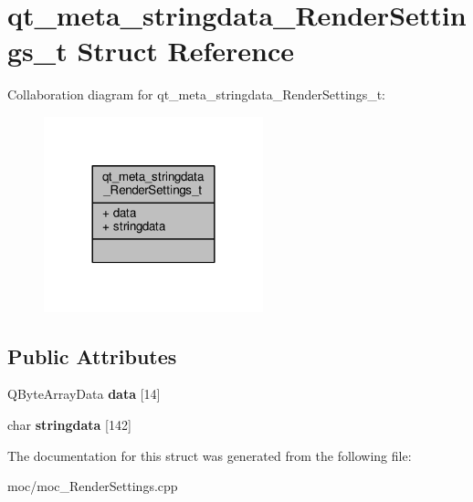 \hypertarget{structqt__meta__stringdata___render_settings__t}{\section{qt\-\_\-meta\-\_\-stringdata\-\_\-\-Render\-Settings\-\_\-t Struct Reference}
\label{structqt__meta__stringdata___render_settings__t}
}


Collaboration diagram for qt\-\_\-meta\-\_\-stringdata\-\_\-\-Render\-Settings\-\_\-t\-:
\nopagebreak
\begin{figure}[H]
\begin{center}
\leavevmode
\includegraphics[width=180pt]{structqt__meta__stringdata___render_settings__t__coll__graph}
\end{center}
\end{figure}
\subsection*{Public Attributes}
\begin{DoxyCompactItemize}
\item 
\hypertarget{structqt__meta__stringdata___render_settings__t_a0dbfd527aa4094b44d368d793ec141aa}{Q\-Byte\-Array\-Data {\bfseries data} \mbox{[}14\mbox{]}}\label{structqt__meta__stringdata___render_settings__t_a0dbfd527aa4094b44d368d793ec141aa}

\item 
\hypertarget{structqt__meta__stringdata___render_settings__t_a6c7bfb6d36a5328de32ec0958ab4c5d2}{char {\bfseries stringdata} \mbox{[}142\mbox{]}}\label{structqt__meta__stringdata___render_settings__t_a6c7bfb6d36a5328de32ec0958ab4c5d2}

\end{DoxyCompactItemize}


The documentation for this struct was generated from the following file\-:\begin{DoxyCompactItemize}
\item 
moc/moc\-\_\-\-Render\-Settings.\-cpp\end{DoxyCompactItemize}
